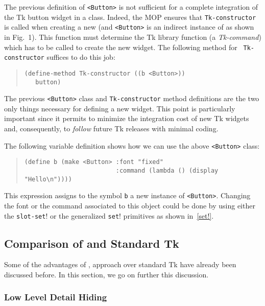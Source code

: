 {The previous definition of {\tt <Button>} is not sufficient for a
complete integration of the Tk button widget in a {\stklos} class. Indeed,
the MOP ensures that {\tt Tk-constructor}\label{Tk-constructor} is called
when creating a new {\tt <Tk-widget>} (and {\tt <Button>} is an indirect
instance of {\tt <Tk-widget>} as shown in Fig.~1). This function must
determine the Tk library function (a {\em Tk-command}) which has to be
called to create the new widget.  The following method for {\tt
Tk-constructor} suffices to do this job:
\begin{quote}\figsize
\begin{verbatim}
(define-method Tk-constructor ((b <Button>)) 
   button)
\end{verbatim}
\end{quote}
The previous {\tt <Button>} class and {\tt Tk-constructor} method
definitions are the two only things necessary for defining a new {\stklos}
widget. This point is particularly important since it permits to minimize
the integration cost of new Tk widgets and, consequently, to {\em follow}
future Tk releases with minimal coding.

The following variable definition shows how we can use the above 
{\tt <Button>} class:
\begin{quote}\figsize
\begin{verbatim}
(define b (make <Button> :font "fixed" 
                         :command (lambda () (display "Hello\n"))))
\end{verbatim}
\end{quote}

\noindent
This expression assigns to the symbol {\tt b} a new instance of 
{\tt <Button>}. Changing the font or the command associated to
this object could be done by using either the {\tt slot-set}! or the
generalized {\tt set}!  primitives as shown in~\ref{set!}.


\subsection{Comparison of {\stklos} and Standard Tk}

Some of the advantages of {\stklos}, approach over standard Tk have
already been discussed before. In this section, we go on further this
discussion.

\subsubsection{Low Level Detail Hiding}

}
